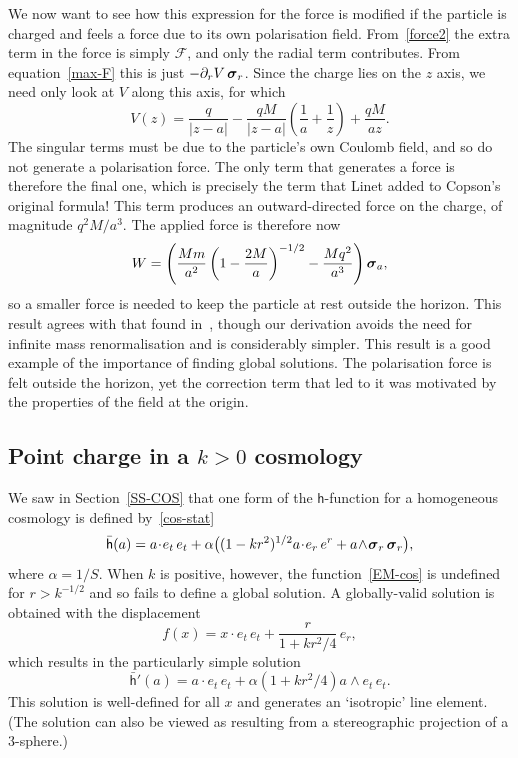 \documentclass[a4paper]{article}
\numberwithin{equation}{section}
\newcommand{\dt}{\! \cdot \!}
\newcommand{\wdg}{\! \wedge \!}
\newcommand{\alp}{\alpha}
\newcommand{\sig}{\mbox{\boldmath $\sigma$}}
\newcommand{\bsig}{\mbox{\boldmath $\sig$}}
\newcommand{\clf}{{\mathcal{F}}}
\newcommand{\dr}{\partial_r}
\newcommand{\sigr}{\bsig_r}
\newcommand{\lih}{\mathsf{h}}
\newcommand{\lbh}{\bar{\mathsf{h}}}
\newcommand{\ho}{\lbh}
\begin{document}
We now want to see how this expression for the force is modified if
the particle is charged and feels a force due to its own polarisation
field.  From~\eqref{force2} the extra term in the force is simply $\clf$,
and only the radial term contributes.  From equation~\eqref{max-F} this is
just $-\dr V \,\sigr$.  Since the charge lies on the $z$ axis, we need
only look at $V$ along this axis, for which
%
\begin{equation}
V(z) =  \frac{q}{|z-a|} - \frac{qM}{|z-a|} \left( \frac{1}{a} +
\frac{1}{z} \right) + \frac{qM}{az}.
\end{equation} 
%
The singular terms must be due to the particle's own Coulomb field,
and so do not generate a polarisation force.  The only term that
generates a force is therefore the final one, which is precisely the
term that Linet added to Copson's original formula!  This term
produces an outward-directed force on the charge, of magnitude $q^2
M/a^3$.  The applied force is therefore now
%
\begin{equation}
W = \left( \frac{Mm}{a^2} \left(1-\frac{2M}{a} \right)^{-1/2} -
\frac{Mq^2}{a^3} \right) \sig_a,
\end{equation}  
%
so a smaller force is needed to keep the particle at rest outside the
horizon.  This result agrees with that found in~\cite{smi80}, though
our derivation avoids the need for infinite mass renormalisation and
is considerably simpler.  This result is a good example of the
importance of finding global solutions.  The polarisation force is
felt outside the horizon, yet the correction term that led to it was
motivated by the properties of the field at the origin.



\subsection[Point charge in a $k>0$ cosmology]{Point charge in a
{\boldmath $k>0$} cosmology} 
\label{MAX-COS}

We saw in Section~\ref{SS-COS} that one form of the $\lih$-function for
a homogeneous cosmology is defined by~\eqref{cos-stat}
%
\begin{equation}
\ho(a) = a \dt e_t \, e_t + \alp \bigl( (1-kr^2)^{1/2} a \dt e_r \, e^r +
a \wdg \sigr \, \sigr \bigr),
\label{EM-cos}
\end{equation}
%
where $\alp=1/S$.  When $k$ is positive, however, the
function~\eqref{EM-cos} is undefined for $r>k^{-1/2}$ and so fails to
define a global solution.  A globally-valid solution is obtained with
the displacement
%
\begin{equation}
f(x) = x\dt e_t \, e_t + \frac{r}{1+k r^2 /4} \, e_r,
\label{EM-cosdisp}
\end{equation}
%
which results in the particularly simple solution
%
\begin{equation}
\ho'(a) = a \dt e_t \, e_t +  \alp (1+ kr^2 /4) a \wdg e_t \, e_t .
\label{EM-cossol}
\end{equation}
%
This solution is well-defined for all $x$ and generates an
`isotropic' line element.  (The solution can also be viewed as
resulting from a stereographic projection of a 3-sphere.)
\end{document}
